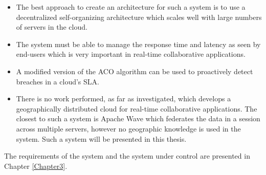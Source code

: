 \begin{itemize}
	\item The best approach to create an architecture for such a system is to use a decentralized self-organizing architecture which scales well with large numbers of servers in the cloud.
	\item The system must be able to manage the response time and latency as seen by end-users which is very important in real-time collaborative applications.
	\item A modified version of the ACO algorithm can be used to proactively detect breaches in a cloud's SLA.
	\item There is no work performed, as far as investigated, which develops a geographically distributed cloud for real-time collaborative applications. The closest to such a system is Apache Wave which federates the data in a session across multiple servers, however no geographic knowledge is used in the system. Such a system will be presented in this thesis.
\end{itemize}

The requirements of the system and the system under control are presented in Chapter \ref{Chapter3}.